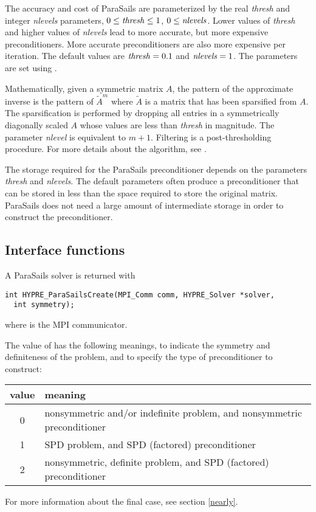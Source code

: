 The accuracy and cost of ParaSails are parameterized by the real {\em thresh}
and integer {\em nlevels} parameters,
$0 \le {\it thresh} \le 1$, $0 \le {\it nlevels}$.
Lower values of {\em thresh}
and higher values of {\em nlevels} lead to more accurate, but more expensive
preconditioners.  More accurate preconditioners are also more expensive
per iteration.  The default values are ${\it thresh} = 0.1$
and ${\it nlevels} = 1$.  The parameters are set using
.

Mathematically, given a symmetric matrix $A$, the pattern of the
approximate inverse is the pattern of $\tilde{A}^m$ where $\tilde{A}$
is a matrix that has been sparsified from $A$.  The sparsification
is performed by dropping all entries in a symmetrically diagonally scaled $A$
whose values are less than {\em thresh} in magnitude.  The parameter
{\em nlevel} is equivalent to $m+1$.
Filtering is a post-thresholding procedure.
For more details about the algorithm, see \cite{EChow_2000}.

The storage required for the ParaSails preconditioner depends on
the parameters {\em thresh} and {\em nlevels}.  The default parameters
often produce a preconditioner that can be stored in less than the
space required to store the original matrix.
ParaSails does not need a large amount of intermediate storage in
order to construct the preconditioner.


\subsection{Interface functions}

A ParaSails solver  is returned with 
\begin{display}
\begin{verbatim}
int HYPRE_ParaSailsCreate(MPI_Comm comm, HYPRE_Solver *solver,
  int symmetry);
\end{verbatim}
\end{display}
where  is the MPI communicator.

The value of  has the following meanings, to indicate
the symmetry and definiteness of the problem, and to specify the 
type of preconditioner to construct:
\begin{center}
\begin{tabular}{|c|l|} \hline
value & meaning \\ \hline
0 & nonsymmetric and/or indefinite problem, and nonsymmetric preconditioner \\
1 & SPD problem, and SPD (factored) preconditioner \\
2 & nonsymmetric, definite problem, and SPD (factored) preconditioner \\ 
\hline
\end{tabular}
\end{center}
For more information about the final case, see section \ref{nearly}.

